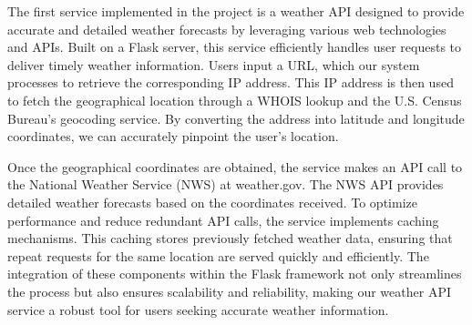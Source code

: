 The first service implemented in the project is a weather API designed to provide accurate and detailed weather forecasts by leveraging various web technologies and APIs. Built on a Flask server, this service efficiently handles user requests to deliver timely weather information. Users input a URL, which our system processes to retrieve the corresponding IP address. This IP address is then used to fetch the geographical location through a WHOIS lookup and the U.S. Census Bureau's geocoding service. By converting the address into latitude and longitude coordinates, we can accurately pinpoint the user's location.

Once the geographical coordinates are obtained, the service makes an API call to the National Weather Service (NWS) at weather.gov. The NWS API provides detailed weather forecasts based on the coordinates received. To optimize performance and reduce redundant API calls, the service implements caching mechanisms. This caching stores previously fetched weather data, ensuring that repeat requests for the same location are served quickly and efficiently. The integration of these components within the Flask framework not only streamlines the process but also ensures scalability and reliability, making our weather API service a robust tool for users seeking accurate weather information.
